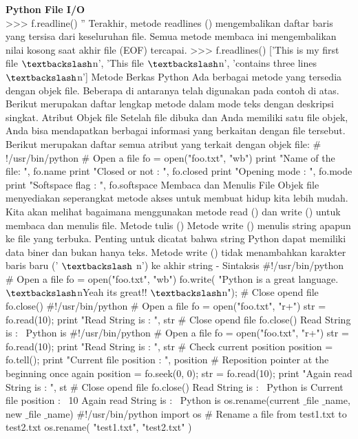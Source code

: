 \begin{center}{\fontsize{24pt}{24pt}\selectfont \textbf{Python File I/O} \\}
>>> f.readline()
''  
Terakhir, metode readlines () mengembalikan daftar baris yang tersisa dari keseluruhan file. Semua metode membaca ini mengembalikan nilai kosong saat akhir file (EOF) tercapai. 
>>> f.readlines() 
['This is my first file $  \textbackslash  $n', 'This file $  \textbackslash  $n', 'contains three lines $  \textbackslash  $n']
Metode Berkas Python
Ada berbagai metode yang tersedia dengan objek file. Beberapa di antaranya telah digunakan pada contoh di atas. 
Berikut merupakan daftar lengkap metode dalam mode teks dengan deskripsi singkat. 
Atribut Objek file
Setelah file dibuka dan Anda memiliki satu file objek, Anda bisa mendapatkan berbagai informasi yang berkaitan dengan file tersebut. 
Berikut merupakan daftar semua atribut yang terkait dengan objek file:
 $  \#  $!/usr/bin/python 
 $  \#  $ Open a file 
fo = open("foo.txt", "wb") 
print "Name of the file: ", fo.name 
print "Closed or not : ", fo.closed 
print "Opening mode : ", fo.mode 
print "Softspace flag : ", fo.softspace 
Membaca dan Menulis File  
Objek file menyediakan seperangkat metode akses untuk membuat hidup kita lebih mudah. Kita akan melihat bagaimana menggunakan metode read () dan write () untuk membaca dan menulis file. 
Metode tulis ()
Metode write () menulis string apapun ke file yang terbuka. Penting untuk dicatat bahwa string Python dapat memiliki data biner dan bukan hanya teks. 
Metode write () tidak menambahkan karakter baris baru (' $  \textbackslash  $ n') ke akhir string -
Sintaksis 
 $  \#  $!/usr/bin/python
\noindent 
 $  \#  $ Open a file 
fo = open("foo.txt", "wb") 
fo.write( "Python is a great language. $  \textbackslash  $nYeah its great!! $  \textbackslash  $n"); 
 $  \#  $ Close opend file 
fo.close() 
 $  \#  $!/usr/bin/python
 $  \#  $ Open a file
fo = open("foo.txt", "r+") 
str = fo.read(10); 
print "Read String is : ", str 
 $  \#  $ Close opend file 
fo.close() 
Read String is :~ Python is
 $  \#  $!/usr/bin/python 
 $  \#  $ Open a file 
fo = open("foo.txt", "r+")
str = fo.read(10); 
print "Read String is : ", str 
 $  \#  $ Check current position
position = fo.tell();
print "Current file position : ", position
 $  \#  $ Reposition pointer at the beginning once again
position = fo.seek(0, 0);
str = fo.read(10);
print "Again read String is : ", st
 $  \#  $ Close opend file
fo.close()
Read String is :~ Python is 
Current file position :~ 10
Again read String is :~ Python is
os.rename(current $  \_  $file $  \_  $name, new $  \_  $file $  \_  $name) 
 $  \#  $!/usr/bin/python
import os 
 $  \#  $ Rename a file from test1.txt to test2.txt 
os.rename( "test1.txt", "test2.txt" ) 

\end{center}
